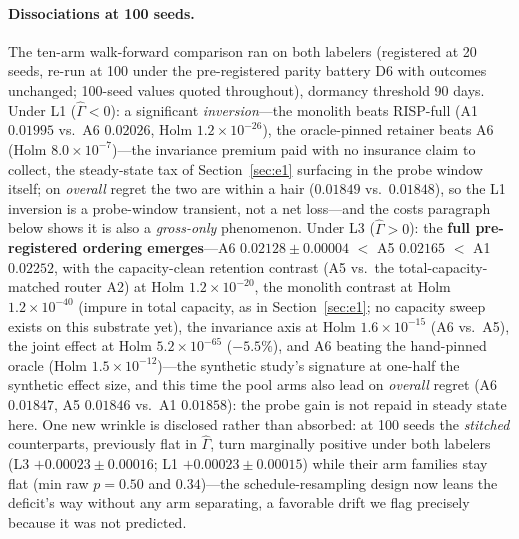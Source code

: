 \documentclass{article}
\newcommand{\nm}{\textsc{RISP}}
\begin{document}
\paragraph{Dissociations at 100 seeds.} The ten-arm
walk-forward comparison ran on both labelers (registered at 20 seeds,
re-run at 100 under the pre-registered parity battery D6 with outcomes
unchanged; 100-seed values quoted throughout), dormancy
threshold 90 days. Under L1 ($\hat\Gamma < 0$): a significant
\emph{inversion}---the monolith beats \nm{}-full (A1 $0.01995$ vs.\ A6
$0.02026$, Holm $1.2\times10^{-26}$), the oracle-pinned retainer beats A6
(Holm $8.0\times10^{-7}$)---the invariance premium paid with no
insurance claim to collect, the steady-state tax of
Section~\ref{sec:e1} surfacing in the probe window itself; on
\emph{overall} regret the two are within a hair
($0.01849$ vs.\ $0.01848$), so the L1 inversion is a probe-window
transient, not a net loss---and the costs paragraph below shows it is
also a \emph{gross-only} phenomenon. Under L3 ($\hat\Gamma > 0$): the
\textbf{full pre-registered ordering emerges}---A6 $0.02128 \pm 0.00004$
$<$ A5 $0.02165$ $<$ A1 $0.02252$, with the capacity-clean retention
contrast (A5 vs.\ the total-capacity-matched router A2) at Holm
$1.2\times10^{-20}$, the monolith contrast at Holm $1.2\times10^{-40}$
(impure in total capacity, as in Section~\ref{sec:e1}; no capacity
sweep exists on this substrate yet), the invariance axis at Holm
$1.6\times10^{-15}$ (A6 vs.\ A5), the joint effect at Holm
$5.2\times10^{-65}$ ($-5.5\%$), and A6 beating the hand-pinned oracle
(Holm $1.5\times10^{-12}$)---the synthetic study's signature at one-half
the synthetic effect size, and this time the pool arms also lead on
\emph{overall} regret (A6 $0.01847$, A5 $0.01846$ vs.\ A1 $0.01858$):
the probe gain is not repaid in steady state here. One new wrinkle is
disclosed rather than absorbed: at 100 seeds the \emph{stitched}
counterparts, previously flat in $\hat\Gamma$, turn marginally
positive under both labelers (L3 $+0.00023 \pm 0.00016$; L1
$+0.00023 \pm 0.00015$) while their arm families stay flat (min raw
$p = 0.50$ and $0.34$)---the schedule-resampling design now leans the
deficit's way without any arm separating, a favorable drift we flag
precisely because it was not predicted.
\end{document}
